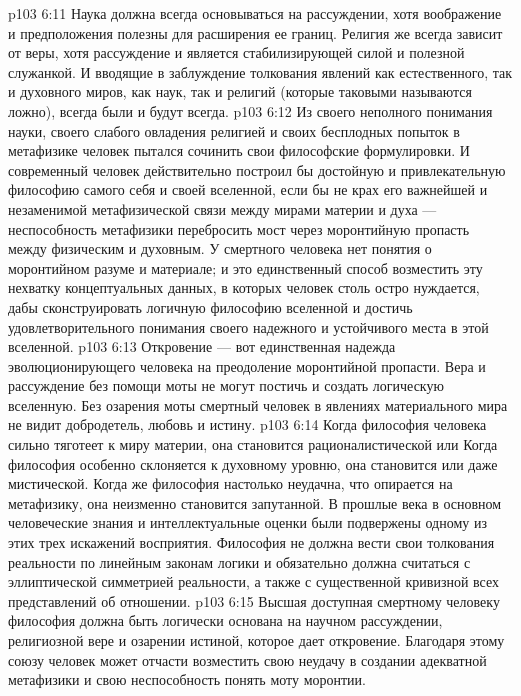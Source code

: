 \vs p103 6:11 \pc Наука должна всегда основываться на рассуждении, хотя воображение и предположения полезны для расширения ее границ. Религия же всегда зависит от веры, хотя рассуждение и является стабилизирующей силой и полезной служанкой. И вводящие в заблуждение толкования явлений как естественного, так и духовного миров, как наук, так и религий (которые таковыми называются ложно), всегда были и будут всегда.
\vs p103 6:12 Из своего неполного понимания науки, своего слабого овладения религией и своих бесплодных попыток в метафизике человек пытался сочинить свои философские формулировки. И современный человек действительно построил бы достойную и привлекательную философию самого себя и своей вселенной, если бы не крах его важнейшей и незаменимой метафизической связи между мирами материи и духа --- неспособность метафизики перебросить мост через моронтийную пропасть между физическим и духовным. У смертного человека нет понятия о моронтийном разуме и материале; и  это единственный способ возместить эту нехватку концептуальных данных, в которых человек столь остро нуждается, дабы сконструировать логичную философию вселенной и достичь удовлетворительного понимания своего надежного и устойчивого места в этой вселенной.
\vs p103 6:13 Откровение --- вот единственная надежда эволюционирующего человека на преодоление моронтийной пропасти. Вера и рассуждение без помощи моты не могут постичь и создать логическую вселенную. Без озарения моты смертный человек в явлениях материального мира не видит добродетель, любовь и истину.
\vs p103 6:14 Когда философия человека сильно тяготеет к миру материи, она становится рационалистической или  Когда философия особенно склоняется к духовному уровню, она становится  или даже мистической. Когда же философия настолько неудачна, что опирается на метафизику, она неизменно становится  запутанной. В прошлые века в основном человеческие знания и интеллектуальные оценки были подвержены одному из этих трех искажений восприятия. Философия не должна вести свои толкования реальности по линейным законам логики и обязательно должна считаться с эллиптической симметрией реальности, а также с существенной кривизной всех представлений об отношении.
\vs p103 6:15 Высшая доступная смертному человеку философия должна быть логически основана на научном рассуждении, религиозной вере и озарении истиной, которое дает откровение. Благодаря этому союзу человек может отчасти возместить свою неудачу в создании адекватной метафизики и свою неспособность понять моту моронтии.
